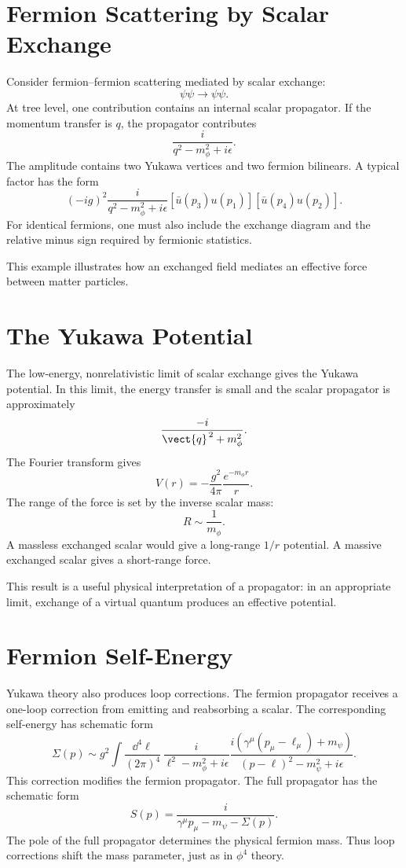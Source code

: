 \section{Fermion Scattering by Scalar Exchange}

Consider fermion--fermion scattering mediated by scalar exchange:
\[
    \psi\psi\longrightarrow\psi\psi.
\]
At tree level, one contribution contains an internal scalar propagator. If the
momentum transfer is \(q\), the propagator contributes
\[
    \frac{i}{q^2-m_\phi^2+i\epsilon}.
\]
The amplitude contains two Yukawa vertices and two fermion bilinears. A typical
factor has the form
\[
    (-ig)^2
    \frac{i}{q^2-m_\phi^2+i\epsilon}
    [\bar u(p_3)u(p_1)]
    [\bar u(p_4)u(p_2)].
\]
For identical fermions, one must also include the exchange diagram and the
relative minus sign required by fermionic statistics.

This example illustrates how an exchanged field mediates an effective force
between matter particles.

\section{The Yukawa Potential}

The low-energy, nonrelativistic limit of scalar exchange gives the Yukawa
potential. In this limit, the energy transfer is small and the scalar propagator
is approximately
\[
    \frac{-i}{\vect{q}^{\,2}+m_\phi^2}.
\]
The Fourier transform gives
\[
    V(r)=-\frac{g^2}{4\pi}\frac{e^{-m_\phi r}}{r}.
\]
The range of the force is set by the inverse scalar mass:
\[
    R\sim \frac{1}{m_\phi}.
\]
A massless exchanged scalar would give a long-range \(1/r\) potential. A massive
exchanged scalar gives a short-range force.

This result is a useful physical interpretation of a propagator: in an
appropriate limit, exchange of a virtual quantum produces an effective
potential.

\section{Fermion Self-Energy}

Yukawa theory also produces loop corrections. The fermion propagator receives a
one-loop correction from emitting and reabsorbing a scalar. The corresponding
self-energy has schematic form
\[
    \Sigma(p)
    \sim g^2\int\frac{\dd^4\ell}{(2\pi)^4}\,
    \frac{i}{\ell^2-m_\phi^2+i\epsilon}
    \frac{i(\gamma^\mu(p_\mu-\ell_\mu)+m_\psi)}{(p-\ell)^2-m_\psi^2+i\epsilon}.
\]
This correction modifies the fermion propagator. The full propagator has the
schematic form
\[
    S(p)=\frac{i}{\gamma^\mu p_\mu-m_\psi-\Sigma(p)}.
\]
The pole of the full propagator determines the physical fermion mass. Thus loop
corrections shift the mass parameter, just as in \(\phi^4\) theory.

